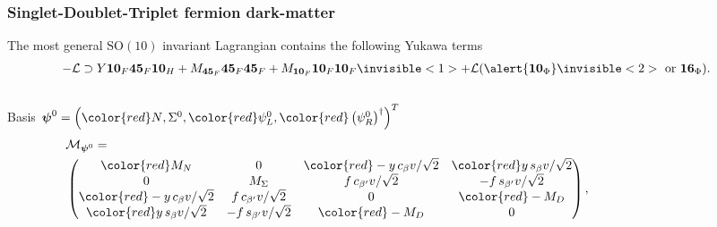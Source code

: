 \documentclass[%
xcolor=dvipsnames,table%
]{beamer}
\begin{document}
\begin{frame}
  \frametitle{{\color{red}Singlet-Doublet}-Triplet fermion dark-matter}
The most general $\text{SO}(10)$ invariant Lagrangian contains the following Yukawa terms
\begin{align*}
-\mathcal{L} & \supset  Y{\bf 10}_F {\bf 45}_F {\bf 10}_H + M_{\mathbf{45}_F}{\bf 45}_F{\bf 45}_F + M_{\mathbf{10}_F}{\bf 10}_F{\bf 10}_F
\invisible<1>{+{\mathcal{L}(\alert{\mathbf{10}_\Phi}\invisible<2>{\ \text{or}\   \mathbf{16}_\Phi})}.} 
\end{align*}



  \begin{columns}
    \begin{column}{0.47\textwidth}
Basis $\boldsymbol{\psi}^0=\left({\color{red}N},\Sigma^0,{\color{red}\psi_L^0},{\color{red}\left( \psi_R^0 \right)^{\dagger}}\right)^T$ 
\tiny
\begin{align*}
  &\mathcal{M}_{\boldsymbol{\psi}^0}=\nonumber\\
&\begin{pmatrix}
{\color{red}M_N}          &   0       &{\color{red}-y\,c_\beta v/\sqrt{2}}&{\color{red}y\,s_\beta v/\sqrt{2}} \\
0 & M_\Sigma &  f\,c_{\beta'}v/\sqrt{2} & -f\,s_{\beta'}v/\sqrt{2}\\
{\color{red}-y\,c_\beta} v/\sqrt{2} &  f\,c_{\beta'}v/\sqrt{2}  & 0            & {\color{red}}-M_D\\
{\color{red}y\,s_\beta v/\sqrt{2}}& -f\,s_{\beta'}v/\sqrt{2}&{\color{red}}  -M_D                &  0  \\
\end{pmatrix},
\end{align*}
    \end{column}
    \begin{column}{0.53\textwidth}
    \end{column}
  \end{columns}


\end{frame}
\end{document}
